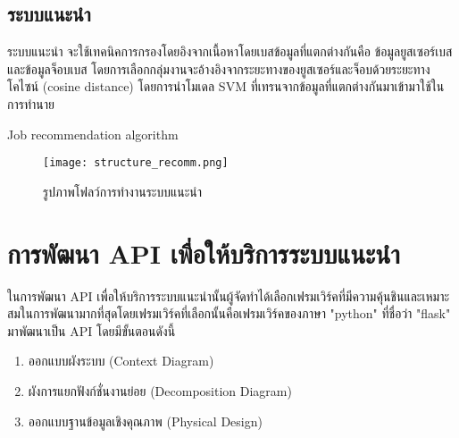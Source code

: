 \subsection{ระบบแนะนำ}

ระบบแนะนำ จะใช้เทคนิคการกรองโดยอิงจากเนื้อหาโดยเบสข้อมูลที่แตกต่างกันคือ ข้อมูลยูสเซอร์เบส และข้อมูลจ็อบเบส โดยการเลือกกลุ่มงานจะอ้างอิงจากระยะทางของยูสเซอร์และจ็อบด้วยระยะทางโคไซน์ (cosine distance) โดยการนำโมเดล SVM ที่เทรนจากข้อมูลที่แตกต่างกันมาเข้ามาใช้ในการทำนาย
\begin{algorithm}
  \DontPrintSemicolon


  \caption{Job recommendation algorithm}
\end{algorithm}

\begin{figure}[!h]
  \centering
  \texttt{[image: structure\_recomm.png]}  
  \caption{รูปภาพโฟลว์การทำงานระบบแนะนำ}
  \label{Fig:strucutre_recomm}
\end{figure}


\pagebreak

\section{การพัฒนา API เพื่อให้บริการระบบแนะนำ}
ในการพัฒนา API เพื่อให้บริการระบบแนะนำนั้นผู้จัดทำได้เลือกเฟรมเวิร์คที่มีความคุ้นชินและเหมาะสมในการพัฒนามากที่สุดโดยเฟรมเวิร์คที่เลือกนั้นคือเฟรมเวิร์คของภาษา "python" ที่ชื่อว่า "flask" มาพัฒนาเป็น API โดยมีขั้นตอนดังนี้
\begin{enumerate}
  \itemsep0em 
  \item ออกแบบผังระบบ (Context Diagram)
  \item ผังการแยกฟังก์ชั่นงานย่อย (Decomposition Diagram)
  \item ออกแบบฐานข้อมูลเชิงคุณภาพ (Physical Design)
\end{enumerate}
\newpage

